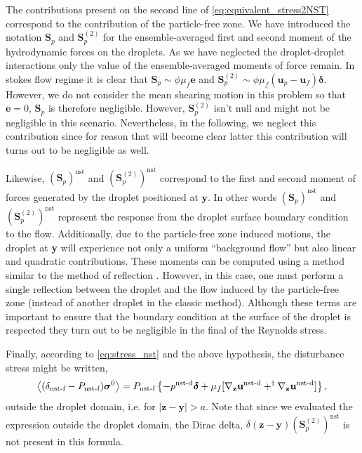 The contributions present on the second line of \ref{eq:equivalent_stress2NST} correspond to the contribution of the particle-free zone. 
We have introduced the notation $\textbf{S}_p$ and $\textbf{S}_p^{(2)}$ for the ensemble-averaged first and second moment of the hydrodynamic forces on the droplets. 
As we have neglected the droplet-droplet interactions only the value of the ensemble-averaged moments of force remain. 
In stokes flow regime it is clear that $\textbf{S}_p \sim  \phi \mu_f \textbf{e}$ and $\textbf{S}_p^{(2)} \sim  \phi \mu_f (\textbf{u}_p - \textbf{u}_f)\bm\delta$.
However, we do not consider the mean shearing motion in this problem so that $\textbf{e}=0$, $\textbf{S}_p$ is therefore negligible. 
However, $\textbf{S}_p^{(2)}$ isn't null and might not be negligible in this scenario. 
Nevertheless, in the following, we neglect this contribution since for reason that will become clear latter this contribution will turns out to be negligible as well.  

Likewise, $(\textbf{S}_p)^\text{nst}$ and $(\textbf{S}_p^{(2)})^\text{nst}$ correspond to the first and second moment of forces generated by the droplet positioned at $\textbf{y}$. 
In other words $(\textbf{S}_p)^\text{nst}$ and $(\textbf{S}_p^{(2)})^\text{nst}$ represent the response from the droplet surface boundary condition to the flow. 
Additionally, due to the particle-free zone induced motions, the droplet at \textbf{y} will experience not only a uniform ``background flow'' but also linear and quadratic contributions. 
These moments can be computed using a method similar to the method of reflection \citep{kim2013microhydrodynamics}. 
However, in this case, one must perform a single reflection between the droplet and the flow induced by the particle-free zone (instead of another droplet in the classic method). 
Although these terms are important to ensure that the boundary condition at the surface of the droplet is respected they turn out to be negligible in the final of the Reynolds stress. 



Finally, according to \ref{eq:stress_nst} and the above hypothesis, the disturbance stress might be written, 
\begin{equation}
    \left<(\delta_\text{nst-f} - P_\text{nst-f}) \bm\sigma^0\right>
    =
    P_\text{nst-f}\left\{
        -p^\text{nst-d}\bm\delta 
        + \mu_f [{\mathbf{\nabla}_\textbf{z}} \textbf{u}^\text{nst-d}+^\dagger{\mathbf{\nabla}_\textbf{z}} \textbf{u}^\text{nst-d}]
    \right\},
\end{equation}
outside the droplet domain, i.e. for $|\textbf{z} - \textbf{y}| > a$. 
Note that since we evaluated the expression outside the droplet domain, the Dirac delta, $\delta(\textbf{z}-\textbf{y})(\textbf{S}_p^{(2)})^\text{nst}$ is not present in this formula. 

